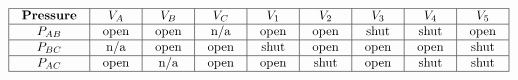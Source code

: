 







$$\vbox{\offinterlineskip
\halign{\strut
\vrule \quad\hfil # \ \hfil & 
\vrule \quad\hfil # \ \hfil & 
\vrule \quad\hfil # \ \hfil & 
\vrule \quad\hfil # \ \hfil & 
\vrule \quad\hfil # \ \hfil & 
\vrule \quad\hfil # \ \hfil & 
\vrule \quad\hfil # \ \hfil & 
\vrule \quad\hfil # \ \hfil & 
\vrule \quad\hfil # \ \hfil \vrule \cr
\noalign{\hrule}
%
{\bf Pressure} & $V_A $ & $V_B $ & $V_C $ & $V_1 $ & $V_2 $ & $V_3 $ & $V_4 $ & $V_5 $    \cr
%
\noalign{\hrule}
%
$P_{AB}$ & open & open & n/a & open & open & shut & shut & open \cr
%
\noalign{\hrule}
%
$P_{BC}$ & n/a & open & open & shut & open & open & open & shut \cr
%
\noalign{\hrule}
%
$P_{AC}$ & open & n/a & open & open & shut & open & shut & shut \cr
%
\noalign{\hrule}
} %
}$$ %





